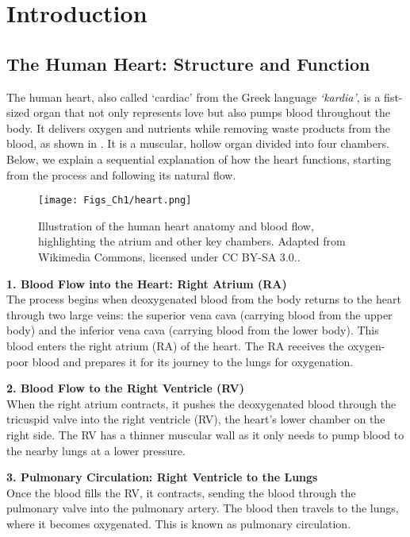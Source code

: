 \chapter{Introduction}
\label{ch:intro}
\section{The Human Heart: Structure and Function}
The human heart, also called `cardiac' from the Greek language \textit{`kardia'}, is a fist-sized organ that not only represents love but also pumps blood throughout the body. It delivers oxygen and nutrients while removing waste products from the blood, as shown in . It is a muscular, hollow organ divided into four chambers. Below, we explain a sequential explanation of how the heart functions, starting from the process and following its natural flow.

\begin{figure}[b!]
\centering
\texttt{[image: Figs\_Ch1/heart.png]}
\caption{Illustration of the human heart anatomy and blood flow, highlighting the atrium and other key chambers. Adapted from Wikimedia Commons, licensed under CC BY-SA 3.0..}
\label{fig1_1}
\end{figure}

\newpage
\noindent\textbf{1. Blood Flow into the Heart: Right Atrium (RA)}\\
The process begins when deoxygenated blood from the body returns to the heart through two large veins: the superior vena cava (carrying blood from the upper body) and the inferior vena cava (carrying blood from the lower body). This blood enters the right atrium (RA) of the heart. The RA receives the oxygen-poor blood and prepares it for its journey to the lungs for oxygenation.

\noindent\textbf{2. Blood Flow to the Right Ventricle (RV)}\\
When the right atrium contracts, it pushes the deoxygenated blood through the tricuspid valve into the right ventricle (RV), the heart's lower chamber on the right side. The RV has a thinner muscular wall as it only needs to pump blood to the nearby lungs at a lower pressure.

\noindent\textbf{3. Pulmonary Circulation: Right Ventricle to the Lungs}\\
Once the blood fills the RV, it contracts, sending the blood through the pulmonary valve into the pulmonary artery. The blood then travels to the lungs, where it becomes oxygenated. This is known as pulmonary circulation.


